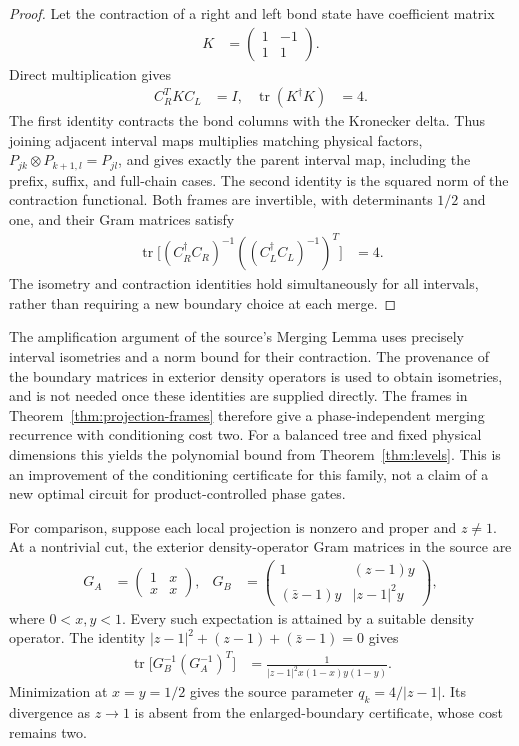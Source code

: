\documentclass[11pt]{article}
\begin{document}
\begin{proof}
Let the contraction of a right and left bond state have coefficient matrix
\begin{align}
 K&=\begin{pmatrix}1&-1\\1&1\end{pmatrix}.
\end{align}
Direct multiplication gives
\begin{align}
 C_R^T K C_L&=I,& \operatorname{tr}(K^\dagger K)&=4.
 \label{eq:projection-contraction}
\end{align}
The first identity contracts the bond columns with the Kronecker delta.
Thus joining adjacent interval maps multiplies matching physical factors,
$P_{jk}\otimes P_{k+1,l}=P_{jl}$, and gives exactly the parent interval map,
including the prefix, suffix, and full-chain cases. The second identity is
the squared norm of the contraction functional. Both frames are invertible,
with determinants $1/2$ and one, and their Gram matrices satisfy
\begin{align}
 \operatorname{tr}\bigl[(C_R^\dagger C_R)^{-1}
                ((C_L^\dagger C_L)^{-1})^T\bigr]&=4.
\end{align}
The isometry and contraction identities hold simultaneously for all
intervals, rather than requiring a new boundary choice at each merge.
\end{proof}

The amplification argument of the source's Merging Lemma uses precisely
interval isometries and a norm bound for their contraction. The provenance
of the boundary matrices in exterior density operators is used to obtain
isometries, and is not needed once these identities are supplied directly.
The frames in Theorem~\ref{thm:projection-frames} therefore give a
phase-independent merging recurrence with conditioning cost two. For a
balanced tree and fixed physical dimensions this yields the polynomial
bound from Theorem~\ref{thm:levels}. This is an improvement of the
conditioning certificate for this family, not a claim of a new optimal
circuit for product-controlled phase gates.

For comparison, suppose each local projection is nonzero and proper and
$z\ne1$. At a nontrivial cut, the exterior density-operator Gram matrices
in the source are
\begin{align}
 G_A&=\begin{pmatrix}1&x\\x&x\end{pmatrix},&
 G_B&=\begin{pmatrix}1&(z-1)y\\(\bar z-1)y&|z-1|^2y\end{pmatrix},
\end{align}
where $0<x,y<1$. Every such expectation is attained by a suitable density
operator. The identity $|z-1|^2+(z-1)+(\bar z-1)=0$ gives
\begin{align}
 \operatorname{tr}\bigl[G_B^{-1}(G_A^{-1})^T\bigr]
 &=\frac{1}{|z-1|^2x(1-x)y(1-y)}.
\end{align}
Minimization at $x=y=1/2$ gives the source parameter
$q_k=4/|z-1|$. Its divergence as $z\to1$ is absent from the enlarged-boundary
certificate, whose cost remains two.
\end{document}
